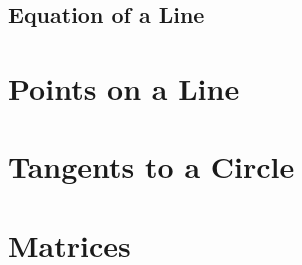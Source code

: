 \documentclass[journal]{IEEEtran}
\begin{document}
\subsection{Equation of a Line}

\appendices
\section{Points on a Line}

\newpage
\section{Tangents to a Circle}

\section{Matrices}

\end{document}
